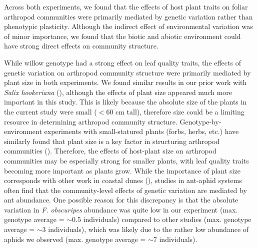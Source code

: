 \documentclass[11pt]{article}
\begin{document}
Across both experiments, we found that the effects of host plant traits on foliar arthropod communities were primarily mediated by genetic variation rather than phenotypic plasticity. Although the indirect effect of environmental variation was of minor importance, we found that the biotic and abiotic environment could have strong direct effects on community structure.

While willow genotype had a strong effect on leaf quality traits, the effects of genetic variation on arthropod community structure were primarily mediated by plant size in both experiments. We found similar results in our prior work with \textit{Salix hookeriana} (\citealt{Barbour_2015}), although the effects of plant size appeared much more important in this study. This is likely because the absolute size of the plants in the current study were small ($<$60 cm tall), therefore size could be a limiting resource in determining arthropod community structure. Genotype-by-environment experiments with small-statured plants (forbs, herbs, etc.) have similarly found that plant size is a key factor in structuring arthropod communities (\citealt{Johnson_2005,Crutsinger_2014}). Therefore, the effects of host-plant size on arthropod communities may be especially strong for smaller plants, with leaf quality traits becoming more important as plants grow. While the importance of plant size corresponds with other work in coastal dunes (\citealt{Crutsinger_2014}), studies in ant-aphid systems often find that the community-level effects of genetic variation are mediated by ant abundance. One possible reason for this discrepancy is that the absolute variation in \textit{F. obscuripes} abundance was quite low in our experiment (max. genotype average = $\sim$0.5 individuals) compared to other studies (max. genotype average = $\sim$3 individuals), which was likely due to the rather low abundance of aphids we observed (max. genotype average = $\sim$7 individuals). 
\end{document}
